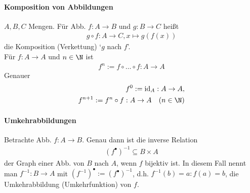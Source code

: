 \paragraph{Komposition von Abbildungen}
$A,B,C$ Mengen. Für Abb. $f: A \to B$ und $g:B\to C$ heißt
\begin{align*}
	g\circ f: A \to C, x \mapsto g(f(x))
\end{align*}
die Komposition (Verkettung) `$g$ nach $f$'.\\
Für $f: A \to A$ und $n\in \N$ ist
\begin{align*}
	f^n:= f \circ \dots \circ f:A \to A
\end{align*}
Genauer
\begin{align*}
	f^0:=\mathrm{id}_A:A\to A, \\
	f^{n+1}:=f^n\circ f: A \to A\quad(n\in \N)
\end{align*}
\paragraph{Umkehrabbildungen}
Betrachte Abb. $f: A\to B$. Genau dann ist die inverse Relation
\begin{align*}
	(f^{\bullet})^{-1}\subseteq B \times A
\end{align*}
der Graph einer Abb. von $B$ nach $A$, wenn $f$ bijektiv ist. In diesem Fall nennt man $f^{-1}:B\to A$ mit $(f^{-1})^{\bullet}:=(f^{\bullet})^{-1}$, d.h. $f^{-1}(b)=a: f(a)=b$, die Umkehrabbildung (Umkehrfunktion) von $f$.
